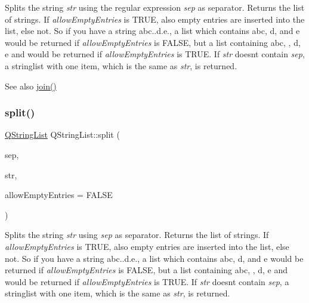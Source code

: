 Splits the string {\itshape str} using the regular expression {\itshape sep} as separator. Returns the list of strings. If {\itshape allow\+Empty\+Entries} is T\+R\+UE, also empty entries are inserted into the list, else not. So if you have a string \textquotesingle{}abc..d.\+e.\textquotesingle{}, a list which contains \textquotesingle{}abc\textquotesingle{}, \textquotesingle{}d\textquotesingle{}, and \textquotesingle{}e\textquotesingle{} would be returned if {\itshape allow\+Empty\+Entries} is F\+A\+L\+SE, but a list containing \textquotesingle{}abc\textquotesingle{}, \textquotesingle{}\textquotesingle{}, \textquotesingle{}d\textquotesingle{}, \textquotesingle{}e\textquotesingle{} and \textquotesingle{}\textquotesingle{} would be returned if {\itshape allow\+Empty\+Entries} is T\+R\+UE. If {\itshape str} doesn\textquotesingle{}t contain {\itshape sep}, a stringlist with one item, which is the same as {\itshape str}, is returned.

\begin{DoxySeeAlso}{See also}
\mbox{\hyperlink{class_q_string_list_a4d14f4987725926a5c812991a27d0f91}{join()}} 
\end{DoxySeeAlso}
\mbox{\label{class_q_string_list_a2c21b167a54aa8a8082996d7f18ca5bd}} 
\subsubsection{\texorpdfstring{split()}{split()}\hspace{0.1cm}{\footnotesize\ttfamily [3/3]}}
{\footnotesize\ttfamily \mbox{\hyperlink{class_q_string_list}{Q\+String\+List}} Q\+String\+List\+::split (\begin{DoxyParamCaption}\item[{const \mbox{\hyperlink{class_q_string}{Q\+String}} \&}]{sep,  }\item[{const \mbox{\hyperlink{class_q_string}{Q\+String}} \&}]{str,  }\item[{bool}]{allow\+Empty\+Entries = {\ttfamily FALSE} }\end{DoxyParamCaption})\hspace{0.3cm}{\ttfamily [static]}}

Splits the string {\itshape str} using {\itshape sep} as separator. Returns the list of strings. If {\itshape allow\+Empty\+Entries} is T\+R\+UE, also empty entries are inserted into the list, else not. So if you have a string \textquotesingle{}abc..d.\+e.\textquotesingle{}, a list which contains \textquotesingle{}abc\textquotesingle{}, \textquotesingle{}d\textquotesingle{}, and \textquotesingle{}e\textquotesingle{} would be returned if {\itshape allow\+Empty\+Entries} is F\+A\+L\+SE, but a list containing \textquotesingle{}abc\textquotesingle{}, \textquotesingle{}\textquotesingle{}, \textquotesingle{}d\textquotesingle{}, \textquotesingle{}e\textquotesingle{} and \textquotesingle{}\textquotesingle{} would be returned if {\itshape allow\+Empty\+Entries} is T\+R\+UE. If {\itshape str} doesn\textquotesingle{}t contain {\itshape sep}, a stringlist with one item, which is the same as {\itshape str}, is returned.

